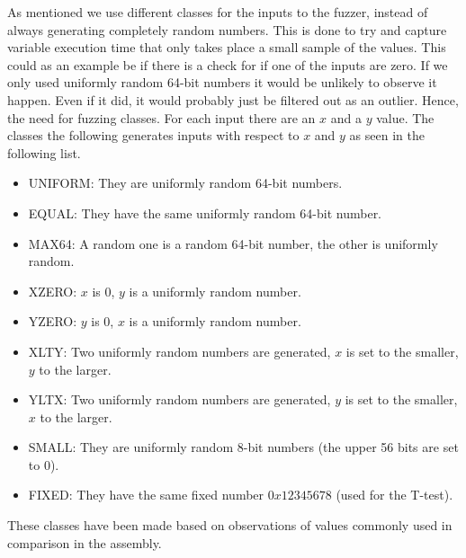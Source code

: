 As mentioned we use different classes for the inputs to the fuzzer, instead of always generating completely random numbers. This is done to try and capture variable execution time that only takes place a small sample of the values. This could as an example be if there is a check for if one of the inputs are zero. If we only used uniformly random 64-bit numbers it would be unlikely to observe it happen. Even if it did, it would probably just be filtered out as an outlier. Hence, the need for fuzzing classes. For each input there are an $x$ and a $y$ value. The classes the following generates inputs with respect to $x$ and $y$ as seen in the following list.
\begin{itemize}
    \item UNIFORM: They are uniformly random 64-bit numbers.
    \item EQUAL:   They have the same uniformly random 64-bit number.
    \item MAX64:   A random one is a random 64-bit number, the other is uniformly random.
    \item XZERO:   $x$ is 0, $y$ is a uniformly random number.
    \item YZERO:   $y$ is 0, $x$ is a uniformly random number.
    \item XLTY:    Two uniformly random numbers are generated, $x$ is set to the smaller, $y$ to the larger.
    \item YLTX:    Two uniformly random numbers are generated, $y$ is set to the smaller, $x$ to the larger.
    \item SMALL:   They are uniformly random 8-bit numbers (the upper 56 bits are set to 0).
    \item FIXED:   They have the same fixed number $0x12345678$ (used for the T-test).
\end{itemize}
These classes have been made based on observations of values commonly used in comparison in the assembly.

